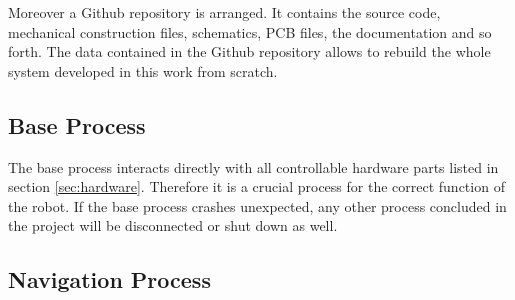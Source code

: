 Moreover a Github repository \cite{github} is arranged. It contains the source code, mechanical construction files, schematics, PCB files, the documentation and so forth. The data contained in the Github repository allows to rebuild the whole system developed in this work from scratch. 

\subsection{Base Process}

The base process interacts directly with all controllable hardware parts listed in section \ref{sec:hardware}. Therefore it is a crucial process for the correct function of the robot. If the base process crashes unexpected, any other process concluded in the project will be disconnected or shut down as well.\\

\subsection{Navigation Process}



